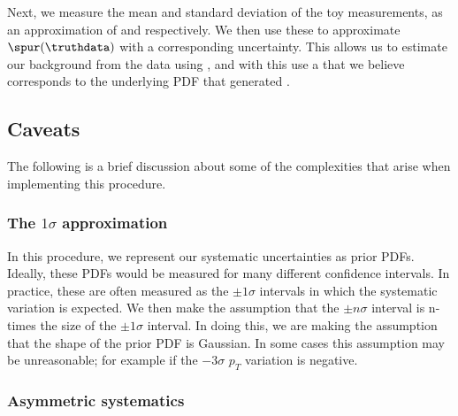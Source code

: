 Next, we measure the mean and standard deviation of the toy measurements, as an approximation of \meanTheta and \stdTheta respectively. We then use these to approximate $\spur(\truthdata)$ with a corresponding uncertainty. This allows us to estimate our background from the data using \nbkgdata, and with this use a \spur that we believe corresponds to the underlying PDF that generated \data.

\subsection*{Caveats}

The following is a brief discussion about some of the complexities that arise when implementing this procedure.

\subsubsection*{The $1\sigma$ approximation}

In this procedure, we represent our systematic uncertainties as prior PDFs.
Ideally, these PDFs would be measured for many different confidence intervals.
In practice, these are often measured as the $\pm 1\sigma$ intervals in which the systematic variation is expected.
We then make the assumption that the $\pm n\sigma$ interval is n-times the size of the $\pm 1\sigma$ interval.
In doing this, we are making the assumption that the shape of the prior PDF is Gaussian.
In some cases this assumption may be unreasonable; for example if the $-3\sigma$ $p_T$ variation is negative.

\subsubsection*{Asymmetric systematics}

